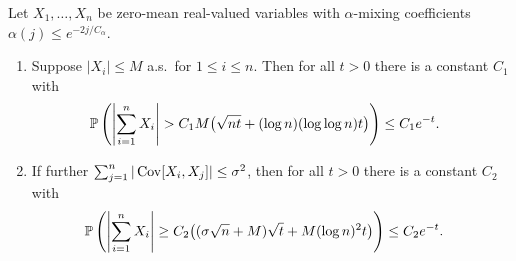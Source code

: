 \begin{lemma}
  \label{lem:exponential_mixing}

  Let $X_1, \ldots, X_n$ be zero-mean real-valued
  variables with $\alpha$-mixing coefficients
  $\alpha(j) \leq e^{-2 j / C_\alpha}$.

  \begin{enumerate}[label=(\roman*)]

    \item
      \label{eq:exponential_mixing_bounded}
      Suppose $|X_i| \leq M$ a.s.\ for $1 \leq i \leq n$.
      Then for all $t > 0$ there is a constant $C_1$ with
      \begin{align*}
        \P\left(
          \left|
          \sum_{i=1}^n
          X_i
          \right|
          > C_1 M \big( \sqrt{n t}
          + (\log n)(\log \log n) t \big)
        \right)
        &\leq
        C_1 e^{-t}.
      \end{align*}
    \item
      \label{eq:exponential_mixing_bernstein}
      If further $\sum_{j=1}^n |\Cov[X_i, X_j]| \leq \sigma^2$,
      then for all $t > 0$ there is a constant $C_2$ with
      \begin{align*}
        \P\left(
          \left|
          \sum_{i=1}^n
          X_i
          \right|
          \geq C_2 \big( (\sigma \sqrt n + M) \sqrt t
          + M (\log n)^2 t \big)
        \right)
        &\leq
        C_2 e^{-t}.
      \end{align*}

  \end{enumerate}

\end{lemma}

